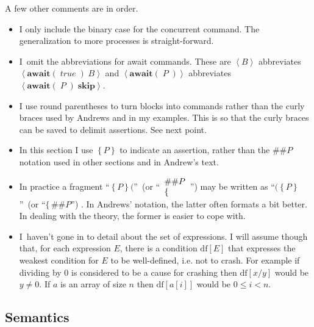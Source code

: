 \documentclass[11pt]{article}%
\begin{document}
A few other comments are in order.

\begin{itemize}
\item I only include the binary case for the concurrent command. The
generalization to more processes is straight-forward.

\item I\ omit the abbreviations for await commands. These are $\left\langle
B\right\rangle $ abbreviates $\left\langle \mathbf{await}(\;\mathit{true}%
\;)\;B\right\rangle $ and $\left\langle \mathbf{await}(\;P\;)\right\rangle $
abbreviates $\left\langle \mathbf{await}(\;P\;)\;\mathbf{skip}\right\rangle $.

\item I use round parentheses to turn blocks into commands rather than the
curly braces used by Andrews and in my examples. This is so that the curly
braces can be saved to delimit assertions. See next point.

\item In this section I use $\left\{  P\right\}  $ to indicate an assertion,
rather than the $\#\#P$ notation used in other sections and in Andrew's text.

\item In practice a fragment \textquotedblleft$\left\{  P\right\}
($\textquotedblright\ (or \textquotedblleft$%
\begin{array}
[c]{l}%
{\small \#\#P}\\
{\small \{}%
\end{array}
$\textquotedblright) may be written as \textquotedblleft$(\left\{  P\right\}
$\textquotedblright\ (or \textquotedblleft$\{\,\#\#P$\textquotedblright) . In
Andrews' notation, the latter often formats a bit better. In dealing with the
theory, the former is easier to cope with.

\item I\ haven't gone in to detail about the set of expressions. I will assume
though that, for each expression $E$, there is a condition $\mathrm{df}[E]$
that expresses the weakest condition for $E$ to be well-defined, i.e. not to
crash. For example if dividing by $0$ is considered to be a cause for crashing
then $\mathrm{df}[x/y]$ would be $y\neq0$. If $a$ is an array of size $n$ then
$\mathrm{df}[a[i]]$ would be $0\leq i<n$.
\end{itemize}

\subsection{Semantics}
\end{document}
